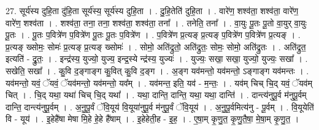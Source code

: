 \documentclass[17pt]{extarticle}
\begin{document}
27. सूर्य॑स्य दुहि॒ता दु॑हि॒ता सूर्य॑स्य॒ सूर्य॑स्य दुहि॒ता । . दु॒हि॒तेति॑ दुहि॒ता । . वारे॑ण॒ शश्व॑ता॒ शश्व॑ता॒ वारे॑ण॒ वारे॑ण॒ शश्व॑ता । . शश्व॑ता॒ तना॒ तना॒ शश्व॑ता॒ शश्व॑ता॒ तना᳚ । . तनेति॒ तना᳚ । . वा॒युः पू॒तः पू॒तो वा॒युर् वा॒युः पू॒तः । . पू॒तः प॒वित्रे॑ण प॒वित्रे॑ण पू॒तः पू॒तः प॒वित्रे॑ण । . प॒वित्रे॑ण प्र॒त्यङ् प्र॒त्यङ् प॒वित्रे॑ण प॒वित्रे॑ण प्र॒त्यङ् । . प्र॒त्यङ् ख्सोमः॒ सोमः॑ प्र॒त्यङ् प्र॒त्यङ् ख्सोमः॑ । . सोमो॒ अति॑द्रुतो॒ अति॑द्रुतः॒ सोमः॒ सोमो॒ अति॑द्रुतः । . अति॑द्रुत॒ इत्यति॑ - द्रु॒तः॒ । . इन्द्र॑स्य॒ युज्यो॒ युज्य॒ इन्द्र॒स्ये न्द्र॑स्य॒ युज्यः॑ । . युज्यः॒ सखा॒ सखा॒ युज्यो॒ युज्यः॒ सखा᳚ । . सखेति॒ सखा᳚ । . कु॒वि द॒ङ्गाङ्ग कु॒वित् कु॒वि द॒ङ्ग । . अ॒ङ्ग यव॑मन्तो॒ यव॑मन्तो॒ ऽङ्गाङ्ग यव॑मन्तः । . यव॑मन्तो॒ यवं॒ ॅयवं॒ ॅयव॑मन्तो॒ यव॑मन्तो॒ यव᳚म् । . यव॑मन्त॒ इति॒ यव॑ - म॒न्तः॒ । . यव॑म् चिच् चि॒द् यवं॒ ॅयव॑म् चित् । . चि॒द् यथा॒ यथा॑ चिच् चि॒द् यथा᳚ । . यथा॒ दान्ति॒ दान्ति॒ यथा॒ यथा॒ दान्ति॑ । . दान्त्य॑नुपू॒र्व म॑नुपू॒र्वम् दान्ति॒ दान्त्य॑नुपू॒र्वम् । . अ॒नु॒पू॒र्वं ॅवि॒यूय॑ वि॒यूया॑नुपू॒र्व म॑नुपू॒र्वं ॅवि॒यूय॑ । . अ॒नु॒पू॒र्वमित्य॑नु - पू॒र्वम् । . वि॒यूयेति॑ वि - यूय॑ । . इ॒हेहै॑षा मेषा मि॒हे हे॒हे है॑षाम् । . इ॒हेहेती॒ह - इ॒ह॒ । . ए॒षा॒म् कृ॒णु॒त॒ कृ॒णु॒तै॒षा॒ मे॒षा॒म् कृ॒णु॒त॒ । \newline
\end{document}
